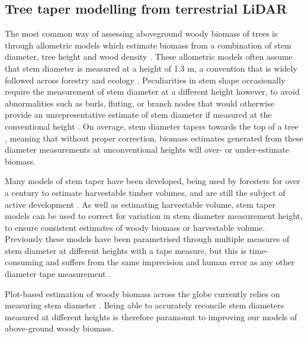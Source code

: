 \begin{refsection}
\subsection{Tree taper modelling from terrestrial LiDAR} 
\label{legacy:ssec:taper}

The most common way of assessing aboveground woody biomass of trees is through allometric models which estimate biomass from a combination of stem diameter, tree height and wood density \citep{Chave2014}. These allometric models often assume that stem diameter is measured at a height of 1.3 m, a convention that is widely followed across forestry and ecology \citep{Brokaw2000}. Peculiarities in stem shape occasionally require the measurement of stem diameter at a different height however, to avoid abnormalities such as burls, fluting, or branch nodes that would otherwise provide an unrepresentative estimate of stem diameter if measured at the conventional height \citep{Kershaw2017}. On average, stem diameter tapers towards the top of a tree \citep{Kozak1969}, meaning that without proper correction, biomass estimates generated from these diameter measurements at unconventional heights will over- or under-estimate biomass. 

Many models of stem taper have been developed, being used by foresters for over a century to estimate harvestable timber volumes, and are still the subject of active development \citep{MacFarlane2016, Luoma2019}. As well as estimating harvestable volume, stem taper models can be used to correct for variation in stem diameter measurement height, to ensure consistent estimates of woody biomass or harvestable volume. Previously these models have been parametrised through multiple measures of stem diameter at different heights with a tape measure, but this is time-consuming and suffers from the same imprecision and human error as any other diameter tape measurement \citep{Saarinen2019}. 

Plot-based estimation of woody biomass across the globe currently relies on measuring stem diameter \citep{Ryan2020, Chave2005, Schepaschenko2019}. Being able to accurately reconcile stem diameters measured at different heights is therefore paramount to improving our models of above-ground woody biomass.


\end{refsection}
